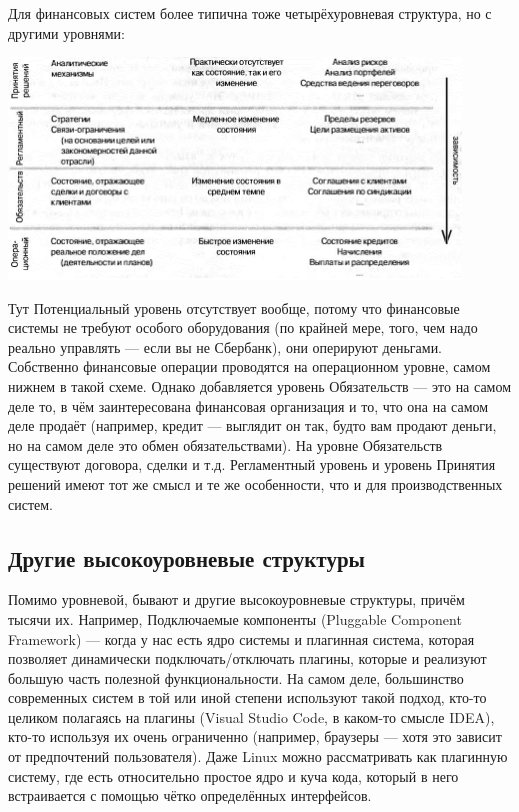 \documentclass{../../text-style}
\begin{document}
Для финансовых систем более типична тоже четырёхуровневая структура, но с другими уровнями:

\begin{center}
    \includegraphics[width=0.9\textwidth]{accountingLayers.png}
\end{center}

Тут Потенциальный уровень отсутствует вообще, потому что финансовые системы не требуют особого оборудования (по крайней мере, того, чем надо реально управлять --- если вы не Сбербанк), они оперируют деньгами. Собственно финансовые операции проводятся на операционном уровне, самом нижнем в такой схеме. Однако добавляется уровень Обязательств --- это на самом деле то, в чём заинтересована финансовая организация и то, что она на самом деле продаёт (например, кредит --- выглядит он так, будто вам продают деньги, но на самом деле это обмен обязательствами). На уровне Обязательств существуют договора, сделки и т.д. Регламентный уровень и уровень Принятия решений имеют тот же смысл и те же особенности, что и для производственных систем.

\subsection{Другие высокоуровневые структуры}

Помимо уровневой, бывают и другие высокоуровневые структуры, причём тысячи их. Например, Подключаемые компоненты (Pluggable Component Framework) --- когда у нас есть ядро системы и плагинная система, которая позволяет динамически подключать/отключать плагины, которые и реализуют большую часть полезной функциональности. На самом деле, большинство современных систем в той или иной степени используют такой подход, кто-то целиком полагаясь на плагины (Visual Studio Code, в каком-то смысле IDEA), кто-то используя их очень ограниченно (например, браузеры --- хотя это зависит от предпочтений пользователя). Даже Linux можно рассматривать как плагинную систему, где есть относительно простое ядро и куча кода, который в него встраивается с помощью чётко определённых интерфейсов.
\end{document}
